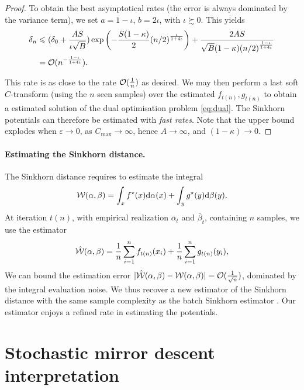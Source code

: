 \begin{proof}
To obtain the best asymptotical rates (the error is always dominated by the variance term), we set $a = 1 - \iota$, $ b = 2 \iota$, with $\iota \succsim 0$. This yields
\begin{align}
    \delta_n &\leqslant 
    (\delta_0 + \frac{A S}{\iota \sqrt{B}})
    \exp\left(- \frac{S(1 - \kappa)}{2} {(n/2)}^{\frac{\iota}{1 + 4\iota}}\right)
    + \frac{2 A S}{\sqrt{B}(1 - \kappa) {(n/2)}^{\frac{1 - \iota}{1 + 4\iota}}} \\
    &= \mathcal{O}(n^{-\frac{1 - \iota}{1 + 4 \iota}}).
\end{align}

This rate is as close to the rate $\mathcal{O}(\frac{1}{n})$ as desired. We may then
perform a last soft $C$-transform (using the $n$ seen samples) over the
estimated $f_{t(n)}, g_{t(n)}$ to obtain a estimated solution of the dual
optimisation problem \eqref{eq:dual}. The Sinkhorn potentials can therefore be
estimated with \textit{fast rates}. Note that the upper bound explodes when $\varepsilon
\to 0$, as $C_{\max} \to \infty$, hence $A \to \infty$, and $(1 - \kappa) \to 0$.
\end{proof}

\paragraph{Estimating the Sinkhorn distance.} The Sinkhorn distance requires to estimate the integral
\begin{equation}
    \mathcal{W}(\alpha, \beta) = \int_x f^\star(x) \textrm{d} \alpha(x) + \int_y g^\star(y) \textrm{d} \beta(y).
\end{equation}
At iteration $t(n)$, with empirical realization $\bar \alpha_t$ and $\bar
\beta_t$, containing $n$ samples, we use the estimator
\begin{equation}
    \hat {\mathcal{W}}(\alpha, \beta) = \frac{1}{n} \sum_{i=1}^n f_{t(n)}(x_i) + \frac{1}{n} \sum_{i=1}^n g_{t(n)}(y_i),
\end{equation}
We can bound the estimation error $|\hat {\mathcal{W}}(\alpha, \beta) - \mathcal{W}(\alpha, \beta) | =
\mathcal{O}(\frac{1}{\sqrt{n}})$, dominated by the integral evaluation noise. We thus recover
a new estimator of the Sinkhorn distance with the same sample complexity as the
batch Sinkhorn estimator \citep{2019-Genevay-aistats}. Our estimator enjoys a
refined rate in estimating the potentials.

\section{Stochastic mirror descent interpretation}
\label{sec-mirror}

